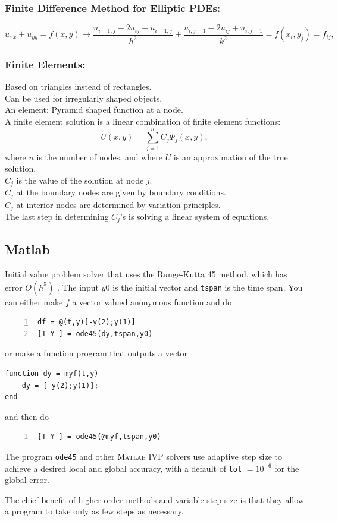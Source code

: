 \subsubsection*{Finite Difference Method for Elliptic PDEs:}
\begin{equation*}
u_{xx} + u_{yy} = f(x,y) \mapsto  \frac{u_{i+1,j} - 2u_{ij} + u_{i-1,j}}{h^2}
    +    \frac{u_{i,j+1} - 2u_{ij} + u_{i,j-1}}{k^2}
       = f(x_i,y_j) = f_{ij},
\end{equation*}


\subsubsection*{Finite Elements:}
Based on triangles instead of rectangles.\\
Can be used for irregularly shaped objects.\\
An element: Pyramid shaped function at a node.\\
A finite element solution is a linear combination of
finite element functions:
$$
U(x,y) = \sum_{j=1}^n C_j \Phi_j(x,y),
$$
where  $n$ is the number of nodes, and where $U$ is
an approximation of the true solution. \\
$C_j$ is the value of the solution at node $j$. \\
$C_j$ at the boundary nodes are given by boundary conditions.\\
$C_j$ at interior nodes are determined by variation principles.\\
The last step in determining $C_j$'s is solving a linear system of equations.\\

\subsection*{\sc Matlab}

Initial value problem solver that uses the Runge-Kutta 45 method,
which has error $O(h^5)$ . The input $y0$
is the initial vector and \verb&tspan& is the time span.  
You can either make $f$ a vector valued anonymous function and do
\begin{lstlisting}[frame=none,numbers=left]
df = @(t,y)[-y(2);y(1)]  
[T Y ] = ode45(dy,tspan,y0)
\end{lstlisting}
or make
a function program that outputs a vector
\begin{lstlisting}
function dy = myf(t,y)
    dy = [-y(2);y(1)];
end
\end{lstlisting}
and then do
\begin{lstlisting}[frame=none,numbers=left]
[T Y ] = ode45(@myf,tspan,y0)
\end{lstlisting}

The program \verb&ode45& and other \textsc{Matlab} IVP solvers use 
adaptive step size to achieve
a desired local and global accuracy, with a default of \verb&tol& $=10^{-6}$ for the global error.

The chief benefit of higher order methods and variable step size is that they allow a program to 
take only as few steps as necessary.


